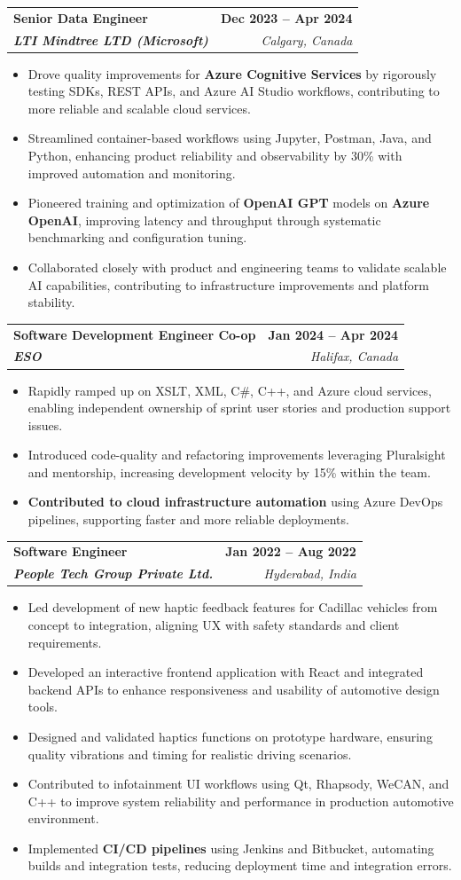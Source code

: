 \documentclass[letterpaper,11pt]{article}
\makeatletter
\newcommand{\resumeItem}[1]{
  \item\small{
    {#1 \vspace{-2pt}}
  }
}
\newcommand{\resumeSubheading}[4]{
  \vspace{-2pt}\item
    \begin{tabular*}{1.0\textwidth}[t]{l@{\extracolsep{\fill}}r}
      \textbf{#1} & \textbf{\small #2} \\
      \textit{\small#3} & \textit{\small #4} \\
    \end{tabular*}\vspace{-7pt}
}
\newcommand{\resumeItemListStart}{\begin{itemize}}
\newcommand{\resumeItemListEnd}{\end{itemize}\vspace{-5pt}}
\makeatother
\begin{document}
    \resumeSubheading
      {\textbf{Senior Data Engineer}}{\textbf{Dec 2023 -- Apr 2024}}
      {\textbf{LTI Mindtree LTD (Microsoft)}}{Calgary, Canada}
      \resumeItemListStart
        \resumeItem{Drove quality improvements for \textbf{Azure Cognitive Services} by rigorously testing SDKs, REST APIs, and Azure AI Studio workflows, contributing to more reliable and scalable cloud services.}
        \resumeItem{Streamlined container-based workflows using Jupyter, Postman, Java, and Python, enhancing product reliability and observability by 30\% with improved automation and monitoring.}
        \resumeItem{Pioneered training and optimization of \textbf{OpenAI GPT} models on \textbf{Azure OpenAI}, improving latency and throughput through systematic benchmarking and configuration tuning.}
        \resumeItem{Collaborated closely with product and engineering teams to validate scalable AI capabilities, contributing to infrastructure improvements and platform stability.}
      \resumeItemListEnd
    
    \resumeSubheading
      {\textbf{Software Development Engineer Co-op}}{\textbf{Jan 2024 -- Apr 2024}}
      {\textbf{ESO}}{Halifax, Canada}
      \resumeItemListStart
        \resumeItem{Rapidly ramped up on XSLT, XML, C\#, C++, and Azure cloud services, enabling independent ownership of sprint user stories and production support issues.}
        \resumeItem{Introduced code-quality and refactoring improvements leveraging Pluralsight and mentorship, increasing development velocity by 15\% within the team.}
        \resumeItem{\textbf{Contributed to cloud infrastructure automation} using Azure DevOps pipelines, supporting faster and more reliable deployments.}
      \resumeItemListEnd

    \resumeSubheading
      {\textbf{Software Engineer}}{\textbf{Jan 2022 -- Aug 2022}}
      {\textbf{People Tech Group Private Ltd.}}{Hyderabad, India}
      \resumeItemListStart
        \resumeItem{Led development of new haptic feedback features for Cadillac vehicles from concept to integration, aligning UX with safety standards and client requirements.}
        \resumeItem{Developed an interactive frontend application with React and integrated backend APIs to enhance responsiveness and usability of automotive design tools.}
        \resumeItem{Designed and validated haptics functions on prototype hardware, ensuring quality vibrations and timing for realistic driving scenarios.}
        \resumeItem{Contributed to infotainment UI workflows using Qt, Rhapsody, WeCAN, and C++ to improve system reliability and performance in production automotive environment.}
        \resumeItem{Implemented \textbf{CI/CD pipelines} using Jenkins and Bitbucket, automating builds and integration tests, reducing deployment time and integration errors.}
      \resumeItemListEnd
\end{document}
